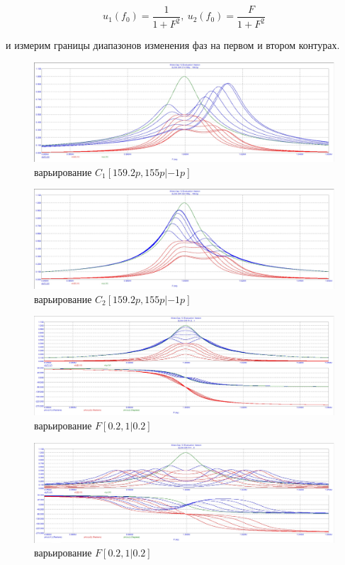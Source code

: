\documentclass[a4paper, 14pt]{extarticle}%
\begin{document}
\[ u_1(f_0) = \frac{1}{1+F^2},\ u_2(f_0) = \frac{F}{1 + F^2} \]

и измерим границы диапазонов изменения фаз на первом и втором контурах.

\begin{figure}[h!]
	\centering
			\includegraphics[width=1.1\linewidth]{1.2_varC1_3.jpg}
            \caption{варьирование $C_1 [159.2p,155p|-1p]$}
	\label{A}
\end{figure}

\begin{figure}[h!]
	\centering
			\includegraphics[width=1.1\linewidth]{1.2_varC1_4.jpg}
            \caption{варьирование $C_2 [159.2p,155p|-1p]$}
	\label{A}
\end{figure}

\begin{figure}[h!]
	\centering
			\includegraphics[width=1.1\linewidth]{1.2varF1.jpg}
            \caption{варьирование $F [0.2, 1|0.2]$}
	\label{A}
\end{figure}


\begin{figure}[h!]
	\centering
			\includegraphics[width=1.1\linewidth]{1.2varF2.jpg}
            \caption{варьирование $F [0.2, 1|0.2]$}
	\label{A}
\end{figure}
\end{document}
